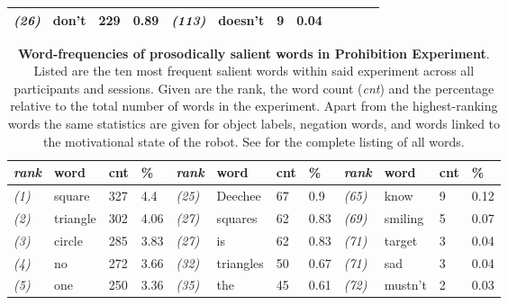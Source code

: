 \begin{screenonly}
\begin{table*}[h]
\begin{tabular*}{\hsize}{@{\extracolsep{\fill}}llllllllllll}
    \textsl{(26)} & don't & 229 & 0.89 & \hspace*{2ex}\textsl{(113)} & doesn't & 9 & 0.04 & & & & \\
    \bottomrule
  \end{tabular*}
\end{table*}
\begin{table*}[h]
\caption{\textbf{Word-frequencies of prosodically salient words in Prohibition Experiment}. Listed are the ten most frequent salient words
    within said experiment across all participants and sessions. Given are the rank, the word count (\emph{cnt}) and the
    percentage relative to the total number of words in the experiment. Apart from the highest-ranking words the same
    statistics are given for object labels, negation words, and words linked to the motivational state of the robot.
    See \cite{Foerster2013} for the complete listing of all words.}
  \label{tbl_wf_ps}
  \begin{tabular*}{\hsize}{@{\extracolsep{\fill}}llllllllllll}
    \textsl{rank} & word & cnt & \% & \hspace*{2ex}\textsl{rank} & word & cnt & \% & \hspace*{2ex}\textsl{rank} & word & cnt & \%\\
    \toprule
    \textsl{(1)} & square & 327 & 4.4 & \hspace*{2ex}\textsl{(25)} & Deechee & 67 & 0.9 & \hspace*{2ex}\textsl{(65)} & know & 9 & 0.12\\
    \textsl{(2)} & triangle & 302 & 4.06 & \hspace*{2ex}\textsl{(27)} & squares & 62 & 0.83 & \hspace*{2ex}\textsl{(69)} & smiling & 5 & 0.07\\
    \textsl{(3)} & circle & 285 & 3.83 & \hspace*{2ex}\textsl{(27)} & is & 62 & 0.83 & \hspace*{2ex}\textsl{(71)} & target & 3 & 0.04\\
    \textsl{(4)} & no & 272 & 3.66 & \hspace*{2ex}\textsl{(32)} & triangles & 50 & 0.67 & \hspace*{2ex}\textsl{(71)} & sad & 3 & 0.04\\
    \textsl{(5)} & one & 250 & 3.36 & \hspace*{2ex}\textsl{(35)} & the & 45 & 0.61 & \hspace*{2ex}\textsl{(72)} & mustn't & 2 & 0.03\\

\end{tabular*}
\end{table*}
\end{screenonly}
